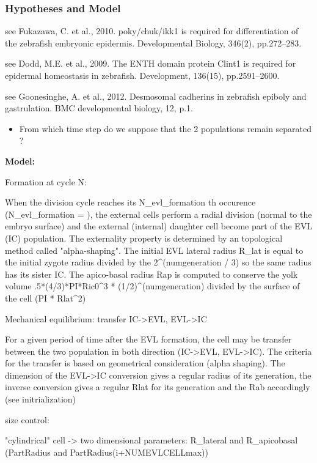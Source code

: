 \subsubsection{Hypotheses and Model }

   see Fukazawa, C. et al., 2010. poky/chuk/ikk1 is required for differentiation of the zebrafish embryonic epidermis. Developmental Biology, 346(2), pp.272–283. \cite{Fukazawa:2010bh}

   see Dodd, M.E. et al., 2009. The ENTH domain protein Clint1 is required for epidermal homeostasis in zebrafish. Development, 136(15), pp.2591–2600. \cite{Dodd:2009hf}

   see Goonesinghe, A. et al., 2012. Desmosomal cadherins in zebrafish epiboly and gastrulation. BMC developmental biology, 12, p.1. \cite{Goonesinghe:2012di}
\begin{itemize}
	\item From which time step do we suppose that the 2 populations remain separated ?
\end{itemize}

\textbf{Model:}

   Formation at cycle N:  

   When the division cycle reaches its N_evl_formation th occurence (N_evl_formation  = ), the external cells perform a radial division (normal to the embryo surface) and the external (internal) daughter cell become part of the EVL (IC) population. The externality property is determined by an topological method called "alpha-shaping". The initial EVL lateral radius R_lat is equal to the initial zygote radius divided by the 2^(numgeneration / 3) so the same radius has its sister IC. The apico-basal radius Rap is computed to conserve the yolk volume .5*(4/3)*PI*Ric0^3 * (1/2)^(numgeneration) divided by the surface of the cell (PI * Rlat^2)  

   Mechanical equilibrium: transfer IC->EVL, EVL->IC  

   For a given period of time after the EVL formation, the cell may be transfer between the two population in both direction (IC->EVL, EVL->IC). The criteria for the transfer is based on geometrical consideration (alpha shaping).    The dimension of the EVL->IC conversion gives a regular radius of its generation, the inverse conversion gives a regular Rlat for its generation and the Rab accordingly (see initrialization)  

   size control:   

   "cylindrical" cell -> two dimensional parameters: R_lateral and R_apicobasal (PartRadius and PartRadius(i+NUMEVLCELLmax))  

